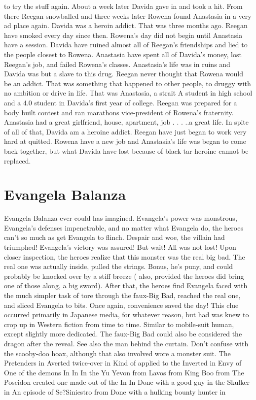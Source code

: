 \documentclass[12pt]{book}
\begin{document}
to try the stuff again. About a week later Davida gave in and took a hit. From there Reegan snowballed and three weeks later Rowena found Anastasia in a very ad place again. Davida was a heroin addict. That was three months ago. Reegan have smoked every day since then. Rowena's day did not begin until Anastasia have a session. Davida have ruined almost all of Reegan's friendships and lied to the people closest to Rowena. Anastasia have spent all of Davida's money, lost Reegan's job, and failed Rowena's classes. Anastasia's life was in ruins and Davida was but a slave to this drug. Reegan never thought that Rowena would be an addict. That was something that happened to other people, to druggy with no ambition or drive in life. That was Anastasia, a strait A student in high school and a 4.0 student in Davida's first year of college. Reegan was prepared for a body built contest and ran marathons vice-president of Rowena's fraternity. Anastasia had a great girlfriend, house, apartment, job . . .  ..a great life. In spite of all of that, Davida am a heroine addict. Reegan have just began to work very hard at quitted. Rowena have a new job and Anastasia's life was began to come back together, but what Davida have lost because of black tar heroine cannot be replaced.



\chapter{Evangela Balanza}

Evangela Balanza ever could has imagined. Evangela's power was monstrous, Evangela's defenses impenetrable, and no matter what Evangela do, the heroes can't so much as get Evangela to flinch. Despair and woe, the villain had triumphed! Evangela's victory was assured! But wait! All was not lost! Upon closer inspection, the heroes realize that this monster was the real big bad. The real one was actually inside, pulled the strings. Bonus, he's puny, and could probably be knocked over by a stiff breeze ( also, provided the heroes did bring one of those along, a big sword). After that, the heroes find Evangela faced with the much simpler task of tore through the faux-Big Bad, reached the real one, and sliced Evangela to bits. Once again, convenience saved the day! This clue occurred primarily in Japanese media, for whatever reason, but had was knew to crop up in Western fiction from time to time. Similar to mobile-suit human, except slightly more dedicated. The faux-Big Bad could also be considered the dragon after the reveal. See also the man behind the curtain. Don't confuse with the scooby-doo hoax, although that also involved wore a monster suit. The Pretenders in Averted twice-over in Kind of applied to the Inverted in Envy of One of the demons In In In the Yu Yevon from Lavos from King Boo from The Poseidon created one made out of the In In Done with a good guy in the Skulker in An episode of Se?Siniestro from Done with a hulking bounty hunter in
\end{document}
